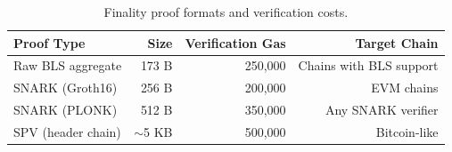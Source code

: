 \begin{table}[H]
\centering
\caption{Finality proof formats and verification costs.}
\label{tab:finality}
\begin{tabular}{lrrr}
\toprule
\textbf{Proof Type} & \textbf{Size} & \textbf{Verification Gas} & \textbf{Target Chain} \\
\midrule
Raw BLS aggregate & 173 B & 250,000 & Chains with BLS support \\
SNARK (Groth16) & 256 B & 200,000 & EVM chains \\
SNARK (PLONK) & 512 B & 350,000 & Any SNARK verifier \\
SPV (header chain) & $\sim$5 KB & 500,000 & Bitcoin-like \\
\bottomrule
\end{tabular}
\end{table}

